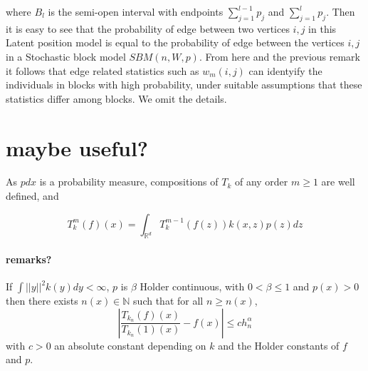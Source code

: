 \documentclass{article}
\begin{document}
where $B_l$ is the semi-open interval with endpoints $\sum_{j=1}^{l-1}p_j$ and $\sum_{j=1}^{l}p_j$.
Then it is easy to see that the probability of edge between two vertices $i,j$ 
in this Latent position model is equal to the probability of edge between the vertices $i,j$ in a Stochastic block model $SBM(n,W,p)$. From here 
and the previous remark 
it follows that edge related statistics such as $w_m(i,j)$ can identyify the individuals in blocks with high probability, under suitable  assumptions that these statistics differ among blocks. We omit the details.



\section{maybe useful?}
As $pdx$ is a probability measure, compositions of $T_k$ of any order
$m\geq 1$
are well defined, and 

\begin{equation*}
    T_k^m(f)(x)=\int_{\mathbb{R}^d} T_k^{m-1}(f(z))k(x,z)p(z)dz
\end{equation*}

\paragraph{ remarks? }
 If $\int ||y||^2k(y)dy<\infty$,
    $p$ is $\beta$ Holder continuous, with $0<\beta\leq 1$ and $p(x)>0$ then there exists $n(x)\in \mathbb{N}$ such that for all $n\geq n(x)$,
    \begin{equation*}
        |\frac{T_{k_n}(f)(x)}{T_{k_n}(1)(x)}-f(x)|\leq ch_n^{\alpha}
    \end{equation*}
    with $c>0$ an absolute constant depending on $k$ and the Holder constants of $f$ and $p$.
\end{document}
